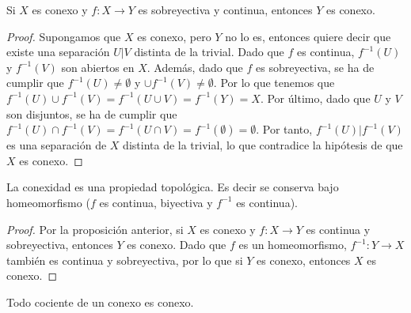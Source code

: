 \begin{proposición}
    Si $X$ es conexo y $f \colon X \to Y$ es sobreyectiva y continua, entonces $Y$ es conexo.
\end{proposición}
\begin{proof}
     Supongamos que $X$ es conexo, pero $Y$ no lo es, entonces quiere decir que existe una separación $U|V$ distinta de la trivial. Dado que $f$ es continua, $f^{-1}(U)$ y $f^{-1}(V)$ son abiertos en $X$. Además, dado que $f$ es sobreyectiva, se ha de cumplir que $f^{-1}(U) \neq \emptyset $ y $\cup f^{-1}(V) \neq \emptyset$. Por lo que tenemos que $f^{-1}(U) \cup f^{-1}(V) = f^{-1}(U \cup V) = f^{-1}(Y) = X$. Por último, dado que $U$ y $V$ son disjuntos, se ha de cumplir que $f^{-1}(U) \cap f^{-1}(V) = f^{-1}(U \cap V) = f^{-1}(\emptyset) = \emptyset$. Por tanto, $f^{-1}(U)|f^{-1}(V)$ es una separación de $X$ distinta de la trivial, lo que contradice la hipótesis de que $X$ es conexo.
\end{proof}
\begin{corolario}
    La conexidad es una propiedad topológica. Es decir se conserva bajo homeomorfismo ($f$ es continua, biyectiva y $f^{-1}$ es continua).
\end{corolario}
\begin{proof}
    Por la proposición anterior, si $X$ es conexo y $f \colon X \to Y$ es continua y sobreyectiva, entonces $Y$ es conexo. Dado que $f$ es un homeomorfismo, $f^{-1} \colon Y \to X$ también es continua y sobreyectiva, por lo que si $Y$ es conexo, entonces $X$ es conexo. 
\end{proof}
\begin{corolario}
    Todo cociente de un conexo es conexo.
\end{corolario}
